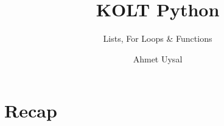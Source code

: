
\usepackage{../KU-Beamer-Template/style/koc} 
\usepackage{minted}
\usepackage{upquote}
\usepackage{graphicx}


\title{KOLT Python}
\subtitle{Lists, For Loops \& Functions} 
\date{}
\author{Ahmet Uysal}


\makeatletter
\let\@@magyar@captionfix\relax
\makeatother

    \maketitle


    \section{Recap}

